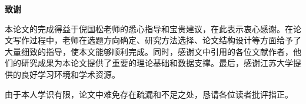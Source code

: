 \documentclass[12pt,a4paper]{ctexart}
\begin{document}
\begin{center}
    {\bfseries 致\quad 谢}
\end{center}
\vspace{12bp}

本论文的完成得益于倪国松老师的悉心指导和宝贵建议，在此表示衷心感谢。在论文写作过程中，老师在选题方向确定、研究方法选择、论文结构设计等方面给予了大量细致的指导，使本文能够顺利完成。同时，感谢文中引用的各位文献作者，他们的研究成果为本论文提供了重要的理论基础和数据支撑。最后，感谢江苏大学提供的良好学习环境和学术资源。

由于本人学识有限，论文中难免存在疏漏和不足之处，恳请各位读者批评指正。
\end{document}
